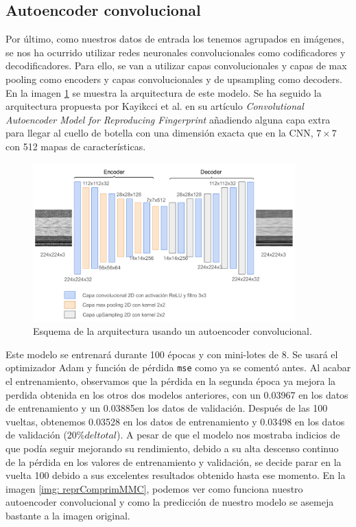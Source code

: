 \subsection{Autoencoder convolucional}

Por último, como nuestros datos de entrada los tenemos agrupados en imágenes, se nos ha ocurrido utilizar redes neuronales convolucionales como codificadores y decodificadores. Para ello, se van a utilizar capas convolucionales y capas de max pooling como encoders y capas convolucionales y de upsampling como decoders. En la imagen \ref{img: caeMMC} se muestra la arquitectura de este modelo. Se ha seguido la arquitectura propuesta por Kayikcci et al. \citep{kayikcci2020convolutional} en su artículo \textit{Convolutional Autoencoder Model for Reproducing Fingerprint} añadiendo alguna capa extra para llegar al cuello de botella con una dimensión exacta que en la CNN, $7 \times 7$ con 512 mapas de características.

\begin{figure}[h]
    \begin{center}
    \includegraphics[width=0.9\textwidth]{img/caeMMC.png}
    \end{center}
    \caption{Esquema de la arquitectura usando un autoencoder convolucional.}
    \label{img: caeMMC}
\end{figure} 

Este modelo se entrenará durante 100 épocas y con mini-lotes de 8. Se usará el optimizador Adam y función de pérdida \lstinline|mse| como ya se comentó antes. Al acabar el entrenamiento, observamos que la pérdida en la segunda época ya mejora la perdida obtenida en los otros dos modelos anteriores, con un 0.03967 en los datos de entrenamiento y un 0.03885en los datos de validación. Después de las 100 vueltas, obtenemos 0.03528 en los datos de entrenamiento y 0.03498 en los datos de validación ($20\% del total$). A pesar de que el modelo nos mostraba indicios de que podía seguir mejorando su rendimiento, debido a su alta descenso continuo de la pérdida en los valores de entrenamiento y validación, se decide parar en la vuelta 100 debido a sus excelentes resultados obtenido hasta ese momento. En la imagen \ref{img: reprComprimMMC}, podemos ver como funciona nuestro autoencoder convolucional y como la predicción de nuestro modelo se asemeja bastante a la imagen original. 

